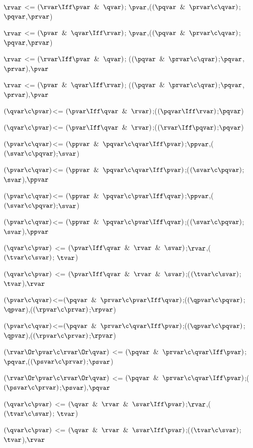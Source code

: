 $\rvar$ <= $(\rvar \Iff \pvar \And \qvar)$; $\pvar$,($(\pqvar \And \prvar \c \qvar)$;$\pqvar$,$\prvar$)

$\rvar$ <= $(\pvar \And \qvar\Iff \rvar)$; $\pvar$,($(\pqvar \And \prvar \c \qvar)$;$\pqvar$,$\prvar$)

$\rvar$ <= $(\rvar \Iff \pvar \And \qvar)$; ($(\pqvar \And \prvar \c \qvar)$;$\pqvar$,$\prvar$),$\pvar$

$\rvar$ <= $(\pvar \And \qvar\Iff\rvar)$; ($(\pqvar \And \prvar \c \qvar)$;$\pqvar$,$\prvar$),$\pvar$

$(\qvar \c \pvar)$<= $(\pvar \Iff \qvar \And \rvar)$;($(\pqvar \Iff \rvar)$;$\pqvar$)

$(\qvar \c \pvar)$<= $(\pvar \Iff \qvar \And \rvar)$;($(\rvar \Iff \pqvar)$;$\pqvar$)

$(\pvar \c \qvar)$<= $(\ppvar \And \pqvar \c \qvar \Iff \pvar)$;$\ppvar$,($(\svar\c\pqvar)$;$\svar$)

$(\pvar \c \qvar)$<= $(\ppvar \And \pqvar \c \qvar \Iff \pvar)$;($(\svar\c\pqvar)$;$\svar$),$\ppvar$

$(\pvar \c \qvar)$<= $(\ppvar \And \pqvar \c \pvar \Iff \qvar)$;$\ppvar$,($(\svar\c\pqvar)$;$\svar$)

$(\pvar \c \qvar)$<= $(\ppvar \And \pqvar \c \pvar \Iff \qvar)$;($(\svar\c\pqvar)$;$\svar$),$\ppvar$

$(\qvar \c \pvar)$ <= $(\pvar \Iff \qvar \And \rvar \And \svar)$;$\rvar$,($(\tvar \c \svar)$; $\tvar$)

$(\qvar \c \pvar)$ <= $(\pvar \Iff \qvar \And \rvar \And \svar)$;($(\tvar \c \svar)$; $\tvar$),$\rvar$

$(\pvar \c \qvar)$<=$(\pqvar \And \prvar \c \pvar \Iff \qvar)$;($(\qpvar \c \pqvar)$;$\qpvar$),($(\rpvar \c \prvar)$;$\rpvar$)

$(\pvar \c \qvar)$<=$(\pqvar \And \prvar \c \qvar \Iff \pvar)$;($(\qpvar \c \pqvar)$;$\qpvar$),($(\rpvar \c \prvar)$;$\rpvar$)

$(\rvar \Or \pvar \c \rvar \Or \qvar)$ <= $(\pqvar\And\prvar\c\qvar \Iff\pvar)$;$\pqvar$,($(\psvar \c \prvar)$;$\psvar$)

$(\rvar \Or \pvar \c \rvar \Or \qvar)$ <= $(\pqvar\And\prvar\c\qvar \Iff\pvar)$;($(\psvar \c \prvar)$;$\psvar$),$\pqvar$

$(\qvar \c \pvar)$ <= $(\qvar \And \rvar \And \svar\Iff\pvar)$;$\rvar$,($(\tvar \c \svar)$; $\tvar$)

$(\qvar \c \pvar)$ <= $(\qvar \And \rvar \And \svar\Iff\pvar)$;($(\tvar \c \svar)$; $\tvar$),$\rvar$

